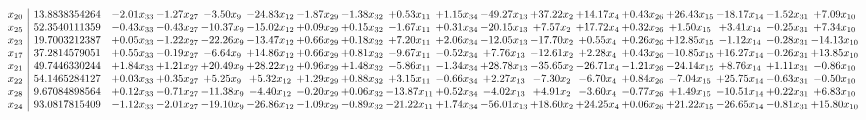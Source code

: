 \documentclass[9pt]{article}
\begin{document}
 \[\begin{array}{c| c c@{\hskip 2pt} c@{\hskip 2pt} c@{\hskip 2pt} c@{\hskip 2pt} c@{\hskip 2pt} c@{\hskip 2pt} c@{\hskip 2pt} c@{\hskip 2pt} c@{\hskip 2pt} c@{\hskip 2pt} c@{\hskip 2pt} c@{\hskip 2pt} c@{\hskip 2pt} c@{\hskip 2pt} c@{\hskip 2pt} c@{\hskip 2pt} }
 x_{20}   &  13.8838354264 & -2.01 x_{33} & -1.27 x_{27} & -3.50 x_{9} & -24.83 x_{12} & -1.87 x_{29} & -1.38 x_{32} & +  0.53 x_{11} & +  1.15 x_{34} & -49.27 x_{13} & + 37.22 x_{2} & + 14.17 x_{4} & +  0.43 x_{26} & + 26.43 x_{15} & -18.17 x_{14} & -1.52 x_{31} & +  7.09 x_{10}\\
 x_{25}   &  52.3540111359 & -0.43 x_{33} & -0.43 x_{27} & -10.37 x_{9} & -15.02 x_{12} & +  0.09 x_{29} & +  0.15 x_{32} & -1.67 x_{11} & +  0.31 x_{34} & -20.15 x_{13} & +  7.57 x_{2} & + 17.72 x_{4} & +  0.32 x_{26} & +  1.50 x_{15} & +  3.41 x_{14} & -0.25 x_{31} & +  7.34 x_{10}\\
 x_{23}   &  19.7003212387 & +  0.05 x_{33} & -1.22 x_{27} & -22.26 x_{9} & -13.47 x_{12} & +  0.66 x_{29} & +  0.18 x_{32} & +  7.20 x_{11} & +  2.06 x_{34} & -12.05 x_{13} & -17.70 x_{2} & +  0.55 x_{4} & +  0.26 x_{26} & + 12.85 x_{15} & -1.12 x_{14} & -0.28 x_{31} & -14.13 x_{10}\\
 x_{17}   &  37.2814579051 & +  0.55 x_{33} & -0.19 x_{27} & -6.64 x_{9} & + 14.86 x_{12} & +  0.66 x_{29} & +  0.81 x_{32} & -9.67 x_{11} & -0.52 x_{34} & +  7.76 x_{13} & -12.61 x_{2} & +  2.28 x_{4} & +  0.43 x_{26} & -10.85 x_{15} & + 16.27 x_{14} & -0.26 x_{31} & + 13.85 x_{10}\\
 x_{21}   &  49.7446330244 & +  1.84 x_{33} & +  1.21 x_{27} & + 20.49 x_{9} & + 28.22 x_{12} & +  0.96 x_{29} & +  1.48 x_{32} & -5.86 x_{11} & -1.34 x_{34} & + 28.78 x_{13} & -35.65 x_{2} & -26.71 x_{4} & -1.21 x_{26} & -24.14 x_{15} & +  8.76 x_{14} & +  1.11 x_{31} & -0.86 x_{10}\\
 x_{22}   &  54.1465284127 & +  0.03 x_{33} & +  0.35 x_{27} & +  5.25 x_{9} & +  5.32 x_{12} & +  1.29 x_{29} & +  0.88 x_{32} & +  3.15 x_{11} & -0.66 x_{34} & +  2.27 x_{13} & -7.30 x_{2} & -6.70 x_{4} & +  0.84 x_{26} & -7.04 x_{15} & + 25.75 x_{14} & -0.63 x_{31} & -0.50 x_{10}\\
 x_{28}   &  9.67084898564 & +  0.12 x_{33} & -0.71 x_{27} & -11.38 x_{9} & -4.40 x_{12} & -0.20 x_{29} & +  0.06 x_{32} & -13.87 x_{11} & +  0.52 x_{34} & -4.02 x_{13} & +  4.91 x_{2} & -3.60 x_{4} & -0.77 x_{26} & +  1.49 x_{15} & -10.51 x_{14} & +  0.22 x_{31} & +  6.83 x_{10}\\
 x_{24}   &  93.0817815409 & -1.12 x_{33} & -2.01 x_{27} & -19.10 x_{9} & -26.86 x_{12} & -1.09 x_{29} & -0.89 x_{32} & -21.22 x_{11} & +  1.74 x_{34} & -56.01 x_{13} & + 18.60 x_{2} & + 24.25 x_{4} & +  0.06 x_{26} & + 21.22 x_{15} & -26.65 x_{14} & -0.81 x_{31} & + 15.80 x_{10}\\

\end{array}\]
\end{document}
